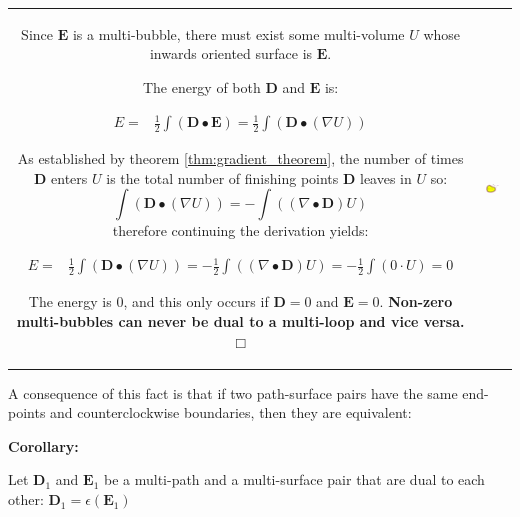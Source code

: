\vspace{5mm}

\begin{center}
\begin{tabular}{cc}
\parbox{0.5\textwidth}{
Since \(\mathbf{E}\) is a multi-bubble, there must exist some multi-volume \(U\) whose inwards oriented surface is \(\mathbf{E}\). 

The energy of both \(\mathbf{D}\) and \(\mathbf{E}\) is:

\begin{align*}
E = & \frac{1}{2}\int (\mathbf{D} \bullet \mathbf{E}) 
= \frac{1}{2} \int (\mathbf{D} \bullet (\nabla U)) 
\end{align*} 

As established by theorem \ref{thm:gradient_theorem}, the number of times \(\mathbf{D}\) enters \(U\) is the total number of finishing points \(\mathbf{D}\) leaves in \(U\) so: 
\[\int (\mathbf{D} \bullet (\nabla U)) = -\int ((\nabla \bullet \mathbf{D}) U)\] 
therefore continuing the derivation yields:

\begin{align*}
E = & \frac{1}{2} \int (\mathbf{D} \bullet (\nabla U)) 
= -\frac{1}{2} \int ((\nabla \bullet \mathbf{D}) U) 
= -\frac{1}{2} \int (0 \cdot U) 
= 0
\end{align*}

The energy is \(0\), and this only occurs if \(\mathbf{D} = 0\) and \(\mathbf{E} = 0\). {\bf Non-zero multi-bubbles can never be dual to a multi-loop and vice versa. \(\Box\)}
} & \parbox{0.5\textwidth}{
\includegraphics[width = 0.5\textwidth]{Duality/loop_bubble_duality}
}
\end{tabular}
\end{center}

A consequence of this fact is that if two path-surface pairs have the same end-points and counterclockwise boundaries, then they are equivalent: 

\textbf{Corollary:}

Let \(\mathbf{D}_1\) and \(\mathbf{E}_1\) be a multi-path and a multi-surface pair that are dual to each other: \(\mathbf{D}_1 = \epsilon(\mathbf{E}_1)\)

